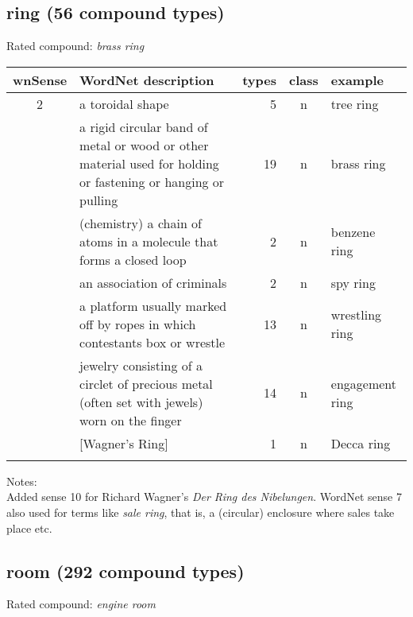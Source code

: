 
\subsection{ring      (56 compound types)}
Rated compound: \emph{brass ring}

\vspace*{1ex}

\noindent
\begin{longtable}{c>{\raggedright\arraybackslash}p{5cm}rc>{\raggedright\arraybackslash}p{2cm}}\lsptoprule
{\small wnSense}&WordNet description&types&class&example\\\midrule
2&a toroidal shape&5&n&tree ring\\\tablevspace
3&a rigid circular band of metal or wood or other material used for holding or fastening or hanging or pulling&19&n&brass ring\\\tablevspace
4&(chemistry) a chain of atoms in a molecule that forms a closed loop&2&n&benzene ring\\\tablevspace
5&an association of criminals&2&n&spy ring\\\tablevspace
7&a platform usually marked off by ropes in which contestants box or wrestle&13&n&wrestling ring\\\tablevspace
8&jewelry consisting of a circlet of precious metal (often set with jewels) worn on the finger&14&n&engagement ring\\\tablevspace
10&{}[Wagner's Ring]&1&n&Decca ring\\\lspbottomrule
\end{longtable}

\noindent
Notes:\\
Added sense 10 for Richard Wagner's \emph{Der Ring des Nibelungen}. WordNet sense 7 also used for terms like \emph{sale ring}, that is, a (circular) enclosure where sales take place etc.

\subsection{room      (292 compound types)}
Rated compound: \emph{engine room}

